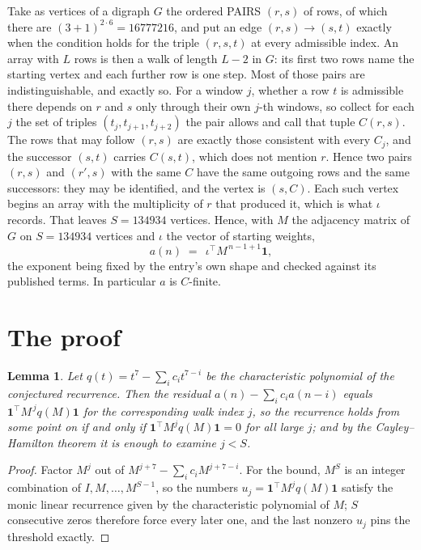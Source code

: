 \documentclass[11pt,a4paper]{article}
\theoremstyle{plain}
\newtheorem{lemma}[theorem]{Lemma}
\theoremstyle{definition}
\begin{document}
Take as vertices of a digraph $G$ the ordered PAIRS $(r,s)$ of rows, of which there are
$(3+1)^{2\cdot6}=16777216$, and put an edge $(r,s)\to(s,t)$ exactly when the condition
holds for the triple $(r,s,t)$ at every admissible index. An array with $L$ rows is then a
walk of length $L-2$ in $G$: its first two rows name the starting vertex and each further
row is one step. Most of those pairs are indistinguishable, and exactly so. For a window $j$, whether a row $t$ is admissible there depends on $r$ and $s$ only through their own $j$-th windows, so collect for each $j$ the set of triples $(t_j,t_{j+1},t_{j+2})$ the pair allows and call that tuple $C(r,s)$. The rows that may follow $(r,s)$ are exactly those consistent with every $C_j$, and the successor $(s,t)$ carries $C(s,t)$, which does not mention $r$. Hence two pairs $(r,s)$ and $(r',s)$ with the same $C$ have the same outgoing rows and the same successors: they may be identified, and the vertex is $(s,C)$. Each such vertex begins an array with the multiplicity of $r$ that produced it, which is what $\iota$ records. That leaves $S=134934$ vertices. Hence, with $M$ the adjacency matrix of $G$ on $S=134934$ vertices and
$\iota$ the vector of starting weights,
\[
a(n)\;=\;\,\iota^{\!\top}M^{\,n-1+1}\mathbf{1},
\]
the exponent being fixed by the entry's own shape and checked against its published terms.
In particular $a$ is $C$-finite.

\section{The proof}

\begin{lemma}\label{lem:crit}
Let $q(t)=t^{7}-\sum_i c_it^{7-i}$ be the characteristic polynomial of the
conjectured recurrence. Then the residual $a(n)-\sum_ic_ia(n-i)$ equals
$\mathbf{1}^{\!\top}M^{\,j}q(M)\mathbf{1}$ for the corresponding walk index
$j$, so the recurrence holds from some point on if and only if
$\mathbf{1}^{\!\top}M^{j}q(M)\mathbf{1}=0$ for all large $j$; and by the
Cayley--Hamilton theorem it is enough to examine $j<S$.
\end{lemma}

\begin{proof}
Factor $M^{j}$ out of $M^{j+7}-\sum_ic_iM^{j+7-i}$. For the bound, $M^{S}$
is an integer combination of $I,M,\dots,M^{S-1}$, so the numbers
$u_j=\mathbf{1}^{\!\top}M^{j}q(M)\mathbf{1}$ satisfy the monic linear recurrence given by
the characteristic polynomial of $M$; $S$ consecutive zeros therefore force every later one,
and the last nonzero $u_j$ pins the threshold exactly.
\end{proof}
\end{document}
